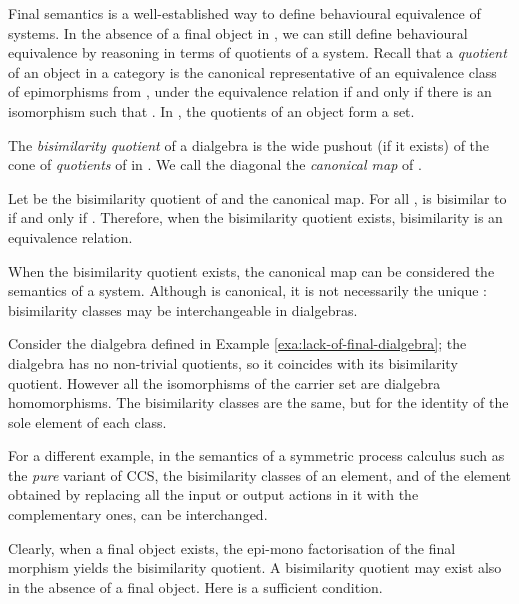 \documentclass[orivec]{llncs}
\newcommand{\defend}{}
\renewenvironment{definition}{\begin{defn}}{\defend\end{defn}}
\begin{document}
Final semantics is a well-established way to define behavioural equivalence of systems. 
In the absence of a final object in , we can still define behavioural equivalence by reasoning in terms of quotients of a system. Recall that a \emph{quotient} of an object  in a category is the canonical representative of an equivalence class of epimorphisms from , under the equivalence relation  if and only if there is an isomorphism  such that . In , the quotients of an object form a set. 

\begin{definition}
 The \emph{bisimilarity quotient} of a dialgebra  is the wide pushout  (if it exists) of the cone of \emph{quotients} of  in . We call the diagonal  the \emph{canonical map} of .
\end{definition}

\begin{proposition}\label{pro:bisimilarity-equivalence}
	Let  be the bisimilarity quotient of  and  the canonical map. For all ,  is bisimilar to  if and only if . Therefore, when the bisimilarity quotient exists, bisimilarity is an equivalence relation.
\end{proposition}

When the bisimilarity quotient exists, the canonical map can be considered the semantics of a system. Although  is canonical, it is not necessarily the unique : bisimilarity classes may be interchangeable in dialgebras. 

\begin{example}Consider the dialgebra  defined in Example \ref{exa:lack-of-final-dialgebra}; the dialgebra has no non-trivial quotients, so it coincides with its bisimilarity quotient. However all the isomorphisms of the carrier set are dialgebra homomorphisms. The bisimilarity classes are the same, but for the identity of the sole element of each class. 
\end{example}

For a different example, in the semantics of a symmetric process calculus such as the \emph{pure} variant of CCS, the bisimilarity classes of an element, and of the element obtained by replacing all the input or output actions in it with the complementary ones, can be interchanged.


Clearly, when a final object exists, the epi-mono factorisation of the final morphism yields the bisimilarity quotient. A bisimilarity quotient may exist also in the absence of a final object. Here is a sufficient condition.
\end{document}
